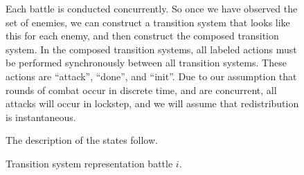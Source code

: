 \documentclass[11pt]{article}
\theoremstyle{definition}
\begin{document}
\begin{figure}
    \begin{center}
    \end{center}
    \caption{
        Transition system representation battle $i$.
    }
    \label{tikz:battle}
    \small
    \justify
    \par
    Each battle is conducted concurrently. So once we
    have observed the set of enemies, we can construct
    a transition system that looks like this for each enemy,
    and then construct the composed transition system.
    In the composed transition systems, all labeled actions
    must be performed synchronously between all
    transition systems. These actions are ``attack'', ``done'', and ``init''.
    Due to our assumption that rounds of combat
    occur in discrete time, and are concurrent,
    all attacks will occur in lockstep, and
    we will assume that redistribution is instantaneous.

    The description of the states follow.


\end{figure}
\end{document}
